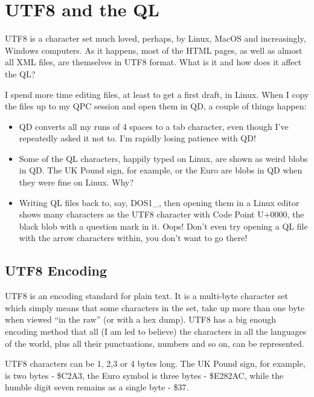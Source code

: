 \chapter{UTF8 and the QL}

UTF8 is a character set much loved, perhaps, by Linux, MacOS and increasingly,
Windows computers. As it happens, most of the HTML pages, as well
as almost all XML files, are themselves in UTF8 format. What is it
and how does it affect the QL?

I spend more time editing files, at least to get a first draft, in
Linux. When I copy the files up to my QPC session and open them in
QD, a couple of things happen:
\begin{itemize}
\item QD converts all my runs of 4 spaces to a tab character, even though
I've repeatedly asked it not to. I'm rapidly losing patience with
QD!
\item Some of the QL characters, happily typed on Linux, are shown as weird
blobs in QD. The UK Pound sign, for example, or the Euro are
blobs in QD when they were fine on Linux. Why?
\item Writing QL files back to, say, DOS1\_, then opening them in a Linux
editor shows many characters as the UTF8 character with Code Point
U+0000, the black blob with a question mark in it. Oops! Don't even
try opening a QL file with the arrow characters within, you don't
want to go there!
\end{itemize}

\section{UTF8 Encoding}

UTF8 is an encoding standard for plain text. It is a multi-byte character
set which simply means that some characters in the set, take up more
than one byte when viewed ``in the raw'' (or with a hex dump). UTF8
has a big enough encoding method that all (I am led to believe) the
characters in all the languages of the world, plus all their punctuations,
numbers and so on, can be represented.

UTF8 characters can be 1, 2,3 or 4 bytes long. The UK Pound sign,
for example, is two bytes - \$C2A3, the Euro symbol is three bytes
- \$E282AC, while the humble digit seven remains as a single byte
- \$37.

